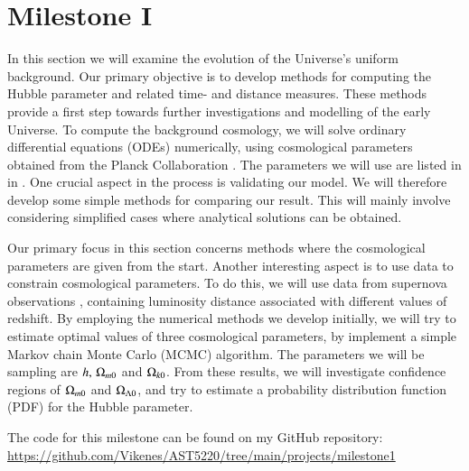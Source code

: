 \section{Milestone I}\label{M1}
In this section we will examine the evolution of the Universe's uniform background. Our primary objective is to develop methods for computing the Hubble parameter and related time- and distance measures. These methods provide a first step towards further investigations and modelling of the early Universe. To compute the background cosmology, we will solve ordinary differential equations (ODEs) numerically, using cosmological parameters obtained from the Planck Collaboration \citep{Planck2020}. The parameters we will use are listed in  in  . One crucial aspect in the process is validating our model. We will therefore develop some simple methods for comparing our result. This will mainly involve considering simplified cases where analytical solutions can be obtained. 

Our primary focus in this section concerns methods where the cosmological parameters are given from the start. Another interesting aspect is to use data to constrain cosmological parameters. To do this, we will use data from supernova observations \citep{Supernova2014Betoule}, containing luminosity distance associated with different values of redshift. By employing the numerical methods we develop initially, we will try to estimate optimal values of three cosmological parameters, by implement a simple Markov chain Monte Carlo (MCMC) algorithm. The parameters we will be sampling are $h,\,\Omega_{m0}$ and $\Omega_{k0}$. From these results, we will investigate confidence regions of $\Omega_{m0}$ and $\Omega_{\Lambda 0}$, and try to estimate a probability distribution function (PDF) for the Hubble parameter. 

The code for this milestone can be found on my GitHub repository: \url{https://github.com/Vikenes/AST5220/tree/main/projects/milestone1}





